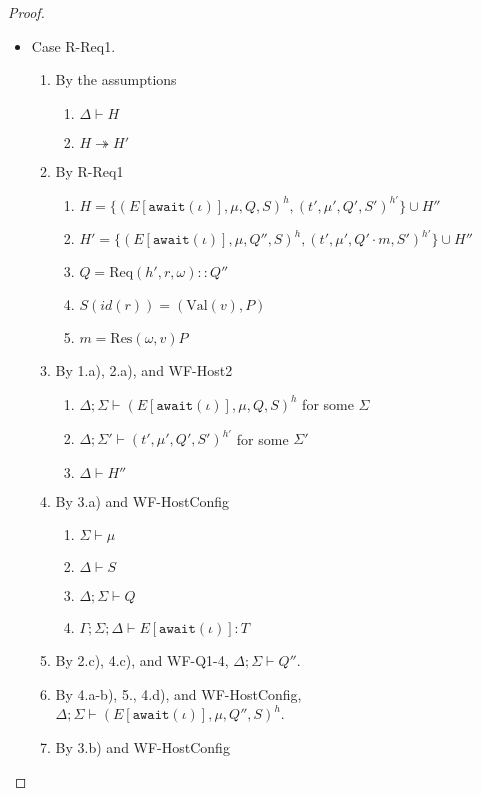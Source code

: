 \documentclass{article}
\theoremstyle{definition}
\newcommand{\Req}[3]{\text{Req}(#1, #2, #3)}
\newcommand{\Res}[2]{\text{Res}(#1, #2)}
\newcommand{\Val}[1]{\text{Val}(#1)}
\begin{document}
\begin{proof}
\begin{itemize}
\item Case R-Req1.
\begin{enumerate}
\item By the assumptions
  \begin{enumerate}[label=(\alph*)]
  \item $\Delta \vdash H$
  \item $H \twoheadrightarrow H'$
  \end{enumerate}
\item By R-Req1
  \begin{enumerate}[label=(\alph*)]
  \item $H = \{ (E[\texttt{await}(\iota)], \mu, Q, S)^h, (t', \mu', Q', S')^{h'} \} \cup H''$
  \item $H' = \{ (E[\texttt{await}(\iota)], \mu, Q'', S)^h, (t', \mu', Q' \cdot m, S')^{h'} \} \cup H''$
  \item $Q        = {\Req {h'} r \omega} :: Q''$
  \item $S(id(r)) = (\Val{v}, P)$
  \item $m        = {\Res \omega v P}$
  \end{enumerate}
\item By 1.a), 2.a), and WF-Host2
  \begin{enumerate}[label=(\alph*)]
  \item $\Delta ; \Sigma \vdash (E[\texttt{await}(\iota)], \mu, Q, S)^h$ for some $\Sigma$
  \item $\Delta ; \Sigma' \vdash (t', \mu', Q', S')^{h'}$ for some $\Sigma'$
  \item $\Delta \vdash H''$
  \end{enumerate}
\item By 3.a) and WF-HostConfig
  \begin{enumerate}[label=(\alph*)]
  \item $\Sigma \vdash \mu$
  \item $\Delta \vdash S$
  \item $\Delta ; \Sigma \vdash Q$
  \item $\Gamma ; \Sigma ; \Delta \vdash E[\texttt{await}(\iota)] : T$
  \end{enumerate}
\item By 2.c), 4.c), and WF-Q1-4, $\Delta ; \Sigma \vdash Q''$.
\item By 4.a-b), 5., 4.d), and WF-HostConfig, $\Delta ; \Sigma \vdash (E[\texttt{await}(\iota)], \mu, Q'', S)^h$.
\item By 3.b) and WF-HostConfig
  \begin{enumerate}[label=(\alph*)]

\end{enumerate}
\end{enumerate}
\end{itemize}
\end{proof}
\end{document}
